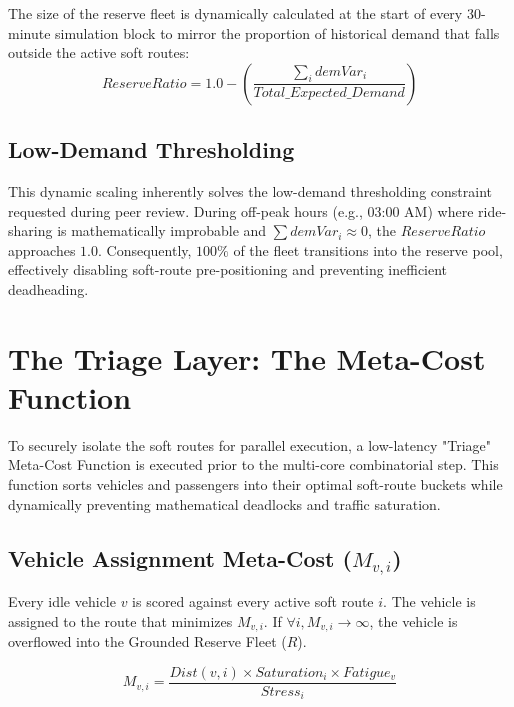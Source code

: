 \documentclass[12pt,a4paper]{article}
\begin{document}
The size of the reserve fleet is dynamically calculated at the start of every 30-minute simulation block to mirror the proportion of historical demand that falls outside the active soft routes:
\begin{equation}
    ReserveRatio = 1.0 - \left( \frac{\sum_{i} demVar_i}{Total\_Expected\_Demand} \right)
\end{equation}

\subsection{Low-Demand Thresholding}
This dynamic scaling inherently solves the low-demand thresholding constraint requested during peer review. During off-peak hours (e.g., 03:00 AM) where ride-sharing is mathematically improbable and $\sum demVar_i \approx 0$, the $ReserveRatio$ approaches $1.0$. Consequently, $100\%$ of the fleet transitions into the reserve pool, effectively disabling soft-route pre-positioning and preventing inefficient deadheading.

\section{The Triage Layer: The Meta-Cost Function}
To securely isolate the soft routes for parallel execution, a low-latency "Triage" Meta-Cost Function is executed prior to the multi-core combinatorial step. This function sorts vehicles and passengers into their optimal soft-route buckets while dynamically preventing mathematical deadlocks and traffic saturation.

\subsection[Vehicle Assignment Meta-Cost (M v,i)]{Vehicle Assignment Meta-Cost ($M_{v, i}$)}
Every idle vehicle $v$ is scored against every active soft route $i$. The vehicle is assigned to the route that minimizes $M_{v, i}$. If $\forall i, M_{v, i} \to \infty$, the vehicle is overflowed into the Grounded Reserve Fleet ($R$).

\begin{equation}
    M_{v, i} = \frac{Dist(v, i) \times Saturation_i \times Fatigue_v}{Stress_i}
\end{equation}
\end{document}
